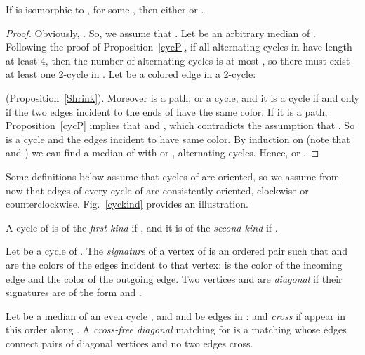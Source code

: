 \documentclass[10pt]{llncs}
\begin{document}
\begin{lemma} \label{cycC}
  If  is isomorphic to , for some , then either
   or .
\end{lemma}

\begin{proof}
  Obviously, . So, we assume that
  . Let  be an arbitrary median of
  . Following the proof of Proposition~\ref{cycP}, if all
  alternating cycles in  have length at least 4, then the number
  of alternating cycles is at most , so there must exist at least
  one 2-cycle in .  Let  be a colored edge in a 2-cycle:
  
  (Proposition~\ref{Shrink}).  Moreover  is a path, or
  a cycle, and it is a cycle if and only if the two edges incident to
  the ends of  have the same color. If it is a path,
  Proposition~\ref{cycP} implies that  and , which contradicts the assumption
  that . So  is a cycle and the
  edges incident to  have same color. By induction on  (note
  that  and ) we can find a
  median of  with  or , alternating
  cycles. Hence,  or . \end{proof}



Some definitions below assume that cycles of  are oriented, so we
assume from now that edges of every cycle of  are consistently
oriented, clockwise or counterclockwise. Fig.~\ref{cyckind} provides
an illustration.

\begin{definition}\label{def:kind-cyc}
  A cycle  of  is of the {\it first kind} if
  , and it is of the {\it second kind} if
  .
\end{definition}

\begin{definition}\label{def:signature}
  Let  be a cycle of . The {\it signature} of a vertex of  is
  an ordered pair  such that  and  are the colors of the
  edges incident to that vertex:  is the color of the incoming edge
  and  the color of the outgoing edge.  Two vertices  and 
  are {\it diagonal} if their signatures are of the form  and
  .
\end{definition}

\begin{definition}\label{def:cross} 
  Let  be a median of an even cycle , and  and  be
  edges in :  and  {\it cross} if  appear
  in this order along . A {\it cross-free diagonal} matching for
   is a matching whose edges connect pairs of diagonal vertices and
  no two edges cross.
\end{definition}
\end{document}

